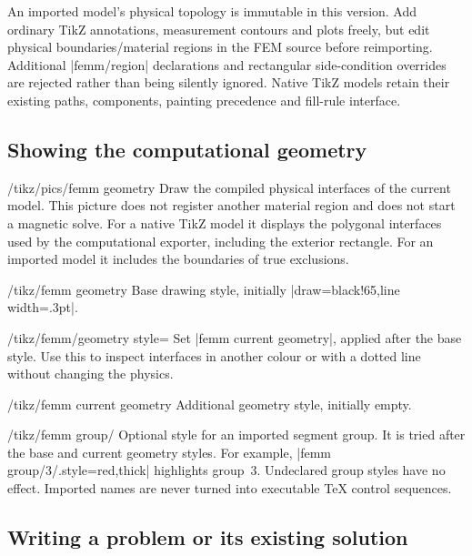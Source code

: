 An imported model's physical topology is immutable in this version. Add ordinary
TikZ annotations, measurement contours and plots freely, but edit physical
boundaries/material regions in the FEM source before reimporting. Additional
|femm/region| declarations and rectangular side-condition overrides are rejected
rather than being silently ignored. Native TikZ models retain their existing
paths, components, painting precedence and fill-rule interface.

\subsection{Showing the computational geometry}

\begin{key}{/tikz/pics/femm geometry}
Draw the compiled physical interfaces of the current model. This picture does
not register another material region and does not start a magnetic solve.
For a native TikZ model it displays the polygonal interfaces used by the
computational exporter, including the exterior rectangle. For an imported model
it includes the boundaries of true exclusions.
\end{key}
\begin{stylekey}{/tikz/femm geometry}
Base drawing style, initially |draw=black!65,line width=.3pt|.
\end{stylekey}
\begin{key}{/tikz/femm/geometry style=}
Set |femm current geometry|, applied after the base style. Use this to inspect
interfaces in another colour or with a dotted line without changing the physics.
\end{key}
\begin{stylekey}{/tikz/femm current geometry}
Additional geometry style, initially empty.
\end{stylekey}
\begin{stylekey}{/tikz/femm group/}
Optional style for an imported segment group. It is tried after the base and
current geometry styles. For example, |femm group/3/.style={red,thick}| highlights
group~3. Undeclared group styles have no effect. Imported names are never turned
into executable TeX control sequences.
\end{stylekey}

\subsection{Writing a problem or its existing solution}

